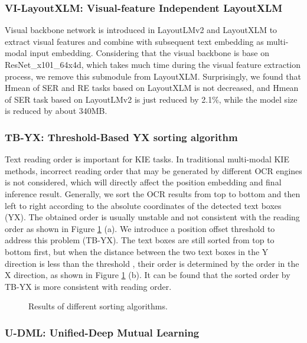 \documentclass[letterpaper]{article} \usepackage{aaai21}  \usepackage{times}  \usepackage{helvet} \usepackage{courier}  \usepackage[hyphens]{url}  \usepackage{graphicx} \usepackage{algorithm}
\begin{document}
\subsubsection{VI-LayoutXLM: Visual-feature Independent LayoutXLM}

Visual backbone network is introduced in LayoutLMv2\cite{layoutlmv2} and LayoutXLM\cite{layoutxlm} to extract visual features and combine with subsequent text embedding as multi-modal input embedding. Considering that the visual backbone is base on ResNet\_x101\_64x4d, which takes much time during the visual feature extraction process, we remove this submodule from LayoutXLM. Surprisingly, we found that Hmean of SER and RE tasks based on LayoutXLM is not decreased, and Hmean of SER task based on LayoutLMv2 is just reduced by 2.1\%, while the model size is reduced by about 340MB.

\subsubsection{TB-YX: Threshold-Based YX sorting algorithm}

Text reading order is important for KIE tasks. In traditional multi-modal KIE methods, incorrect reading order that may be generated by different OCR engines is not considered, which will directly affect the position embedding and final inference result. Generally, we sort the OCR results from top to bottom and then left to right according to the absolute coordinates of the detected text boxes (YX). The obtained order is usually unstable and not consistent with the reading order as shown in Figure \ref{kie_sorting_algo} (a). We introduce a position offset threshold  to address this problem (TB-YX). The text boxes are still sorted from top to bottom first, but when the distance between the two text boxes in the Y direction is less than the threshold , their order is determined by the order in the X direction, as shown in Figure \ref{kie_sorting_algo} (b). It can be found that the sorted order by TB-YX is more consistent with reading order.


\begin{figure}[H]
\centering
{}
\caption{Results of different sorting algorithms.}
\label{kie_sorting_algo}
\end{figure}


\subsubsection{U-DML: Unified-Deep Mutual Learning}
\end{document}
